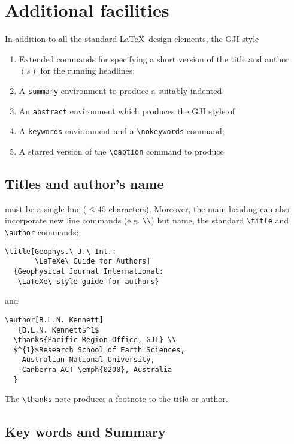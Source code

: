 \section{Additional facilities}

In addition to all the standard \LaTeX\ design elements, the GJI style
\begin{enumerate}
  \item Extended commands for specifying a short version of the title and
        author$(s)$ for the running headlines;
  \item A \verb"summary" environment to produce a suitably indented
  \item An \verb"abstract" environment which produces the GJI style of
  \item A \verb"keywords" environment and a \verb"\nokeywords" command;
  \item A starred version of the \verb"\caption" command to produce
 \end{enumerate}

\subsection{Titles and author's name}

must be a single line ($\leqslant 45$ characters). Moreover, the main
heading can also incorporate new line commands (e.g. \verb"\\") but
name, the standard \verb"\title" and \verb"\author" commands:
\begin{verbatim}
\title[Geophys.\ J.\ Int.:
       \LaTeXe\ Guide for Authors]
  {Geophysical Journal International:
   \LaTeXe\ style guide for authors}
\end{verbatim}
and
\begin{verbatim}
\author[B.L.N. Kennett]
   {B.L.N. Kennett$^1$
  \thanks{Pacific Region Office, GJI} \\
  $^{1}$Research School of Earth Sciences,
    Australian National University,
    Canberra ACT \emph{0200}, Australia
  }
\end{verbatim}
The \verb"\thanks" note produces a footnote to the title or author.

\subsection{Key words and Summary}

